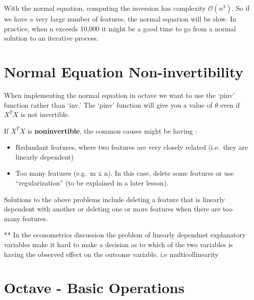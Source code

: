 \documentclass[
]{book}
\newenvironment{Shaded}{\begin{snugshade}}{\end{snugshade}}
\newcommand{\CommentTok}[1]{\textcolor[rgb]{0.56,0.35,0.01}{\textit{#1}}}
\newcommand{\FloatTok}[1]{\textcolor[rgb]{0.00,0.00,0.81}{#1}}
\newcommand{\OperatorTok}[1]{\textcolor[rgb]{0.81,0.36,0.00}{\textbf{#1}}}
\providecommand{\tightlist}{%
  \setlength{\itemsep}{0pt}\setlength{\parskip}{0pt}}
\begin{document}
With the normal equation, computing the inversion has complexity \(\mathcal{O}(n^3)\). So if we have a very large number of features, the normal equation will be slow. In practice, when n exceeds 10,000 it might be a good time to go from a normal solution to an iterative process.

\hypertarget{normal-equation-non-invertibility}{%
\section{Normal Equation Non-invertibility}\label{normal-equation-non-invertibility}}

When implementing the normal equation in octave we want to use the `pinv' function rather than `inv.' The `pinv' function will give you a value of \(\theta\) even if \(X^TX\) is not invertible.

If \(X^TX\) is \textbf{noninvertible}, the common causes might be having :

\begin{itemize}
\tightlist
\item
  Redundant features, where two features are very closely related (i.e.~they are linearly dependent)
\item
  Too many features (e.g.~m ≤ n). In this case, delete some features or use ``regularization'' (to be explained in a later lesson).
\end{itemize}

Solutions to the above problems include deleting a feature that is linearly dependent with another or deleting one or more features when there are too many features.

** In the econometrics discussion the problem of linearly dependnet explanatory variables make it hard to make a decision as to which of the two variables is having the observed effect on the outcome variable. i.e multicollinearity

\hypertarget{octave---basic-operations}{%
\section{Octave - Basic Operations}\label{octave---basic-operations}}

\begin{Shaded}
\end{Shaded}
\end{document}
